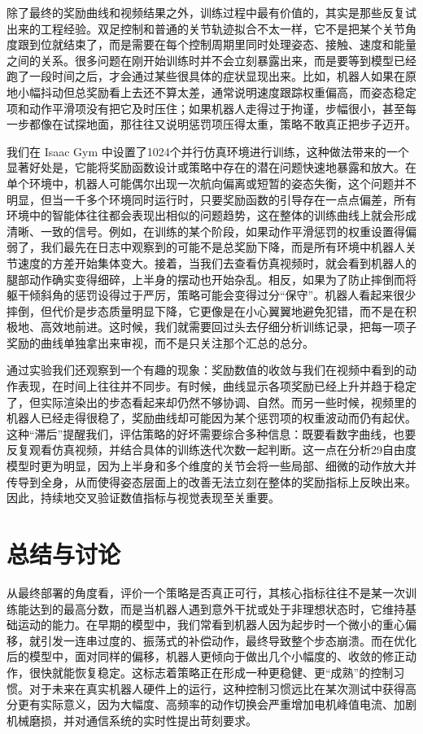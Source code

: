 除了最终的奖励曲线和视频结果之外，训练过程中最有价值的，其实是那些反复试出来的工程经验。双足控制和普通的关节轨迹拟合不太一样，它不是把某个关节角度跟到位就结束了，而是需要在每个控制周期里同时处理姿态、接触、速度和能量之间的关系。很多问题在刚开始训练时并不会立刻暴露出来，而是要等到模型已经跑了一段时间之后，才会通过某些很具体的症状显现出来。比如，机器人如果在原地小幅抖动但总奖励看上去还不算太差，通常说明速度跟踪权重偏高，而姿态稳定项和动作平滑项没有把它及时压住；如果机器人走得过于拘谨，步幅很小，甚至每一步都像在试探地面，那往往又说明惩罚项压得太重，策略不敢真正把步子迈开。

我们在 Isaac Gym 中设置了1024个并行仿真环境进行训练，这种做法带来的一个显著好处是，它能将奖励函数设计或策略中存在的潜在问题快速地暴露和放大。在单个环境中，机器人可能偶尔出现一次航向偏离或短暂的姿态失衡，这个问题并不明显，但当一千多个环境同时运行时，只要奖励函数的引导存在一点点偏差，所有环境中的智能体往往都会表现出相似的问题趋势，这在整体的训练曲线上就会形成清晰、一致的信号。例如，在训练的某个阶段，如果动作平滑惩罚的权重设置得偏弱了，我们最先在日志中观察到的可能不是总奖励下降，而是所有环境中机器人关节速度的方差开始集体变大。接着，当我们去查看仿真视频时，就会看到机器人的腿部动作确实变得细碎，上半身的摆动也开始杂乱。相反，如果为了防止摔倒而将躯干倾斜角的惩罚设得过于严厉，策略可能会变得过分“保守”。机器人看起来很少摔倒，但代价是步态质量明显下降，它更像是在小心翼翼地避免犯错，而不是在积极地、高效地前进。这时候，我们就需要回过头去仔细分析训练记录，把每一项子奖励的曲线单独拿出来审视，而不是只关注那个汇总的总分。

通过实验我们还观察到一个有趣的现象：奖励数值的收敛与我们在视频中看到的动作表现，在时间上往往并不同步。有时候，曲线显示各项奖励已经上升并趋于稳定了，但实际渲染出的步态看起来却仍然不够协调、自然。而另一些时候，视频里的机器人已经走得很稳了，奖励曲线却可能因为某个惩罚项的权重波动而仍有起伏。这种“滞后”提醒我们，评估策略的好坏需要综合多种信息：既要看数字曲线，也要反复观看仿真视频，并结合具体的训练迭代次数一起判断。这一点在分析29自由度模型时更为明显，因为上半身和多个维度的关节会将一些局部、细微的动作放大并传导到全身，从而使得姿态层面上的改善无法立刻在整体的奖励指标上反映出来。因此，持续地交叉验证数值指标与视觉表现至关重要。

\section{总结与讨论}
\label{sec:conclusion}

从最终部署的角度看，评价一个策略是否真正可行，其核心指标往往不是某一次训练能达到的最高分数，而是当机器人遇到意外干扰或处于非理想状态时，它维持基础运动的能力。在早期的模型中，我们常看到机器人因为起步时一个微小的重心偏移，就引发一连串过度的、振荡式的补偿动作，最终导致整个步态崩溃。而在优化后的模型中，面对同样的偏移，机器人更倾向于做出几个小幅度的、收敛的修正动作，很快就能恢复稳定。这标志着策略正在形成一种更稳健、更“成熟”的控制习惯。对于未来在真实机器人硬件上的运行，这种控制习惯远比在某次测试中获得高分更有实际意义，因为大幅度、高频率的动作切换会严重增加电机峰值电流、加剧机械磨损，并对通信系统的实时性提出苛刻要求。

